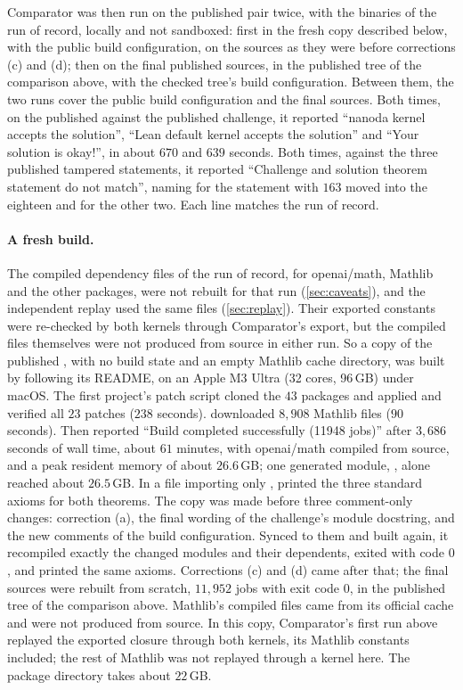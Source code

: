 \documentclass[11pt]{article}
\theoremstyle{definition}
\begin{document}
{Comparator was then run on the published pair twice, with the binaries of the run of record, locally and not sandboxed: first in the fresh copy described below, with the public build configuration, on the sources as they were before corrections (c) and (d); then on the final published sources, in the published tree of the comparison above, with the checked tree's build configuration. Between them, the two runs cover the public build configuration and the final sources. Both times, on the published  against the published challenge, it reported ``nanoda kernel accepts the solution'', ``Lean default kernel accepts the solution'' and ``Your solution is okay!'', in about $670$ and $639$ seconds. Both times, against the three published tampered statements, it reported ``Challenge and solution theorem statement do not match'', naming  for the statement with $163$ moved into the eighteen and  for the other two. Each line matches the run of record.

\paragraph{A fresh build.} The compiled dependency files of the run of record, for openai/math, Mathlib  and the other packages, were not rebuilt for that run (\cref{sec:caveats}), and the independent replay used the same files (\cref{sec:replay}). Their exported constants were re-checked by both kernels through Comparator's export, but the compiled files themselves were not produced from source in either run. So a copy of the published , with no build state and an empty Mathlib cache directory, was built by following its README, on an Apple M3 Ultra (32 cores, 96\,GB) under macOS. The first project's patch script cloned the $43$ packages and applied and verified all $23$ patches ($238$ seconds).  downloaded $8{,}908$ Mathlib files ($90$ seconds). Then  reported ``Build completed successfully (11948 jobs)'' after $3{,}686$ seconds of wall time, about $61$ minutes, with openai/math compiled from source, and a peak resident memory of about $26.6$\,GB; one generated module, , alone reached about $26.5$\,GB. In a file importing only ,  printed the three standard axioms for both theorems. The copy was made before three comment-only changes: correction (a), the final wording of the challenge's module docstring, and the new comments of the build configuration. Synced to them and built again, it recompiled exactly the changed modules and their dependents, exited with code $0$, and printed the same axioms. Corrections (c) and (d) came after that; the final sources were rebuilt from scratch, $11{,}952$ jobs with exit code $0$, in the published tree of the comparison above. Mathlib's compiled files came from its official cache and were not produced from source. In this copy, Comparator's first run above replayed the exported closure through both kernels, its Mathlib constants included; the rest of Mathlib was not replayed through a kernel here. The package directory takes about $22$\,GB.

}
\end{document}

